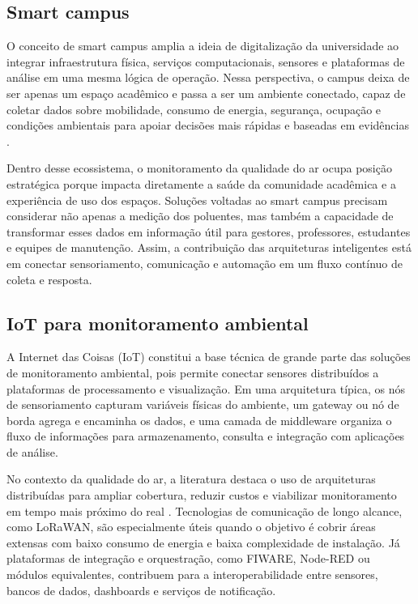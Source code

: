 \documentclass[12pt,a4paper]{article}
\begin{document}
\subsection{Smart campus}
O conceito de smart campus amplia a ideia de digitalização da universidade ao integrar infraestrutura física, 
serviços computacionais, sensores e plataformas de análise em uma mesma lógica de operação. Nessa perspectiva, o 
campus deixa de ser apenas um espaço acadêmico e passa a ser um ambiente conectado, capaz de coletar dados sobre mobilidade, 
consumo de energia, segurança, ocupação e condições ambientais para apoiar decisões mais rápidas e baseadas em evidências \cite{minallah2020}.

Dentro desse ecossistema, o monitoramento da qualidade do ar ocupa posição estratégica porque impacta diretamente a saúde da 
comunidade acadêmica e a experiência de uso dos espaços. Soluções voltadas ao smart campus precisam considerar não apenas a medição dos 
poluentes, mas também a capacidade de transformar esses dados em informação útil para gestores, professores, estudantes e equipes de manutenção. 
Assim, a contribuição das arquiteturas inteligentes está em conectar sensoriamento, comunicação e automação em um fluxo contínuo de coleta e resposta.

\subsection{IoT para monitoramento ambiental}
A Internet das Coisas (IoT) constitui a base técnica de grande parte das soluções de monitoramento ambiental, pois permite conectar sensores 
distribuídos a plataformas de processamento e visualização. Em uma arquitetura típica, os nós de sensoriamento capturam variáveis físicas do 
ambiente, um gateway ou nó de borda agrega e encaminha os dados, e uma camada de middleware organiza o fluxo de informações para armazenamento, 
consulta e integração com aplicações de análise.

No contexto da qualidade do ar, a literatura destaca o uso de arquiteturas distribuídas para ampliar cobertura, reduzir custos e viabilizar 
monitoramento em tempo mais próximo do real \cite{mokrani2019,cunha2024}. Tecnologias de comunicação de longo alcance, como LoRaWAN, são especialmente 
úteis quando o objetivo é cobrir áreas extensas com baixo consumo de energia e baixa complexidade de instalação. Já plataformas de integração e 
orquestração, como FIWARE, Node-RED ou módulos equivalentes, contribuem para a interoperabilidade entre sensores, bancos de dados, dashboards e 
serviços de notificação.
\end{document}
